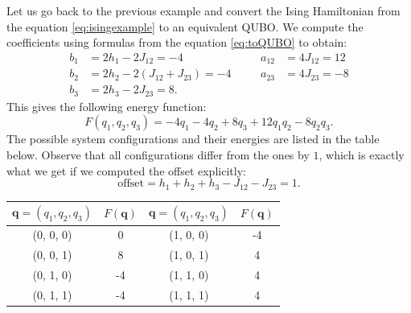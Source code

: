 \begin{example}
  Let us go back to the previous example and convert the Ising Hamiltonian from the equation \eqref{eq:isingexample}
  to an equivalent QUBO. We compute the coefficients using formulas from the equation \eqref{eq:toQUBO} to obtain:
  \begin{equation}
    \begin{alignedat}{6}
      b_{1} &= 2h_{1} - 2 J_{12} = -4            &\quad & a_{12} &= 4J_{12}=12\\
      b_{2} &= 2h_{2} - 2(J_{12} + J_{23}) = -4 &\quad & a_{23} &= 4J_{23}=-8\\
      b_{3} &= 2h_{3} - 2J_{23} = 8.             & & &
    \end{alignedat}
  \end{equation}
  This gives the following energy function:
  \begin{equation}
    F(q_{1}, q_{2}, q_{3}) = -4q_{1} -4q_{2}+8q_{3}+12q_{1}q_{2}-8q_{2}q_{3}.
  \end{equation}
  The possible system configurations and their energies are listed in the table below.
  Observe that all configurations differ from the ones by $1$, which is exactly what we get
  if we computed the offset explicitly:
  \begin{equation}
    \mbox{offset} = h_{1} + h_{2} + h_{3} - J_{12} - J_{23} = 1.
  \end{equation}

  \begin{table}[ht!]
    \begin{center}
      \begin{tabular}{|c|c||c|c|}
        \hline
        $\mathbf{q}=(q_1, q_2, q_3)$ &
        $F(\mathbf{q})$              &
        $\mathbf{q}=(q_1, q_2, q_3)$ &
        $F(\mathbf{q})$                                    \\\hline
        (0, 0, 0)                    & 0  & (1, 0, 0) & -4 \\ \hline
        (0, 0, 1)                    & 8  & (1, 0, 1) & 4  \\ \hline
        (0, 1, 0)                    & -4 & (1, 1, 0) & 4  \\ \hline
        (0, 1, 1)                    & -4 & (1, 1, 1) & 4  \\ \hline
      \end{tabular}
    \end{center}
  \end{table}

\end{example}

